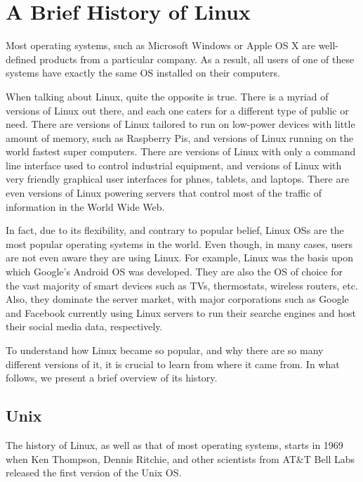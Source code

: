 \chapter{A Brief History of Linux}\label{ch:history}

Most operating systems, such as Microsoft Windows or Apple OS X are well-defined products from a particular company. As a result, all users of one of these systems have exactly the same \acs{OS} installed on their computers.

When talking about Linux, quite the opposite is true. There is a myriad of versions of Linux out there, and each one caters for a different type of public or need. There are versions of Linux tailored to run on low-power devices with little amount of memory, such as Raspberry Pis, and versions of Linux running on the world fastest super computers. There are versions of Linux with only a command line interface used to control industrial equipment, and versions of Linux with very friendly graphical user interfaces for phnes, tablets, and laptops. There are even versions of Linux powering servers that control most of the traffic of information in the World Wide Web.

In fact, due to its flexibility, and contrary to popular belief, Linux \acs{OS}s are the most popular operating systems in the world. Even though, in many cases, users are not even aware they are using Linux. For example, Linux was the basis upon which Google's Android \acs{OS} was developed. They are also the \acs{OS} of choice for the vast majority of smart devices such as TVs, thermostats, wireless routers, etc. Also, they dominate the server market, with major corporations such as Google and Facebook currently using Linux servers to run their searche engines and host their social media data, respectively.

To understand how Linux became so popular, and why there are so many different versions of it, it is crucial to learn from where it came from. In what follows, we present a brief overview of its history.

\section{Unix}

The history of Linux, as well as that of most operating systems, starts in 1969 when Ken Thompson, Dennis Ritchie, and other scientists from AT\&T Bell Labs released the first version of the Unix \acs{OS}.

